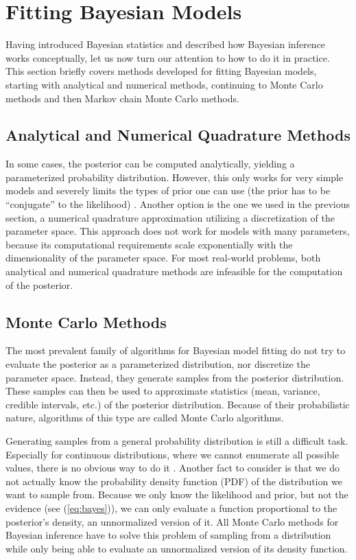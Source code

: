 \documentclass[12pt, a4paper]{report}
\begin{document}
\FloatBarrier
\section{Fitting Bayesian Models}
Having introduced Bayesian statistics and described how Bayesian inference works conceptually, let us now turn our attention to how to do it in practice.
This section briefly covers methods developed for fitting Bayesian models, starting with analytical and numerical methods, continuing to Monte Carlo methods and then Markov chain Monte Carlo methods.

\subsection{Analytical and Numerical Quadrature Methods}
In some cases, the posterior can be computed analytically, yielding a parameterized probability distribution.
However, this only works for very simple models and severely limits the types of prior one can use (the prior has to be ``conjugate'' to the likelihood) \cite[39]{mcelreath}.
Another option is the one we used in the previous section, a numerical quadrature approximation utilizing a discretization of the parameter space.
This approach does not work for models with many parameters, because its computational requirements scale exponentially with the dimensionality of the parameter space.
For most real-world problems, both analytical and numerical quadrature methods are infeasible for the computation of the posterior.

\subsection{Monte Carlo Methods}
The most prevalent family of algorithms for Bayesian model fitting do not try to evaluate the posterior as a parameterized distribution, nor discretize the parameter space.
Instead, they generate samples from the posterior distribution.
These samples can then be used to approximate statistics (mean, variance, credible intervals, etc.) of the posterior distribution.
Because of their probabilistic nature, algorithms of this type are called Monte Carlo algorithms.

Generating samples from a general probability distribution is still a difficult task.
Especially for continuous distributions, where we cannot enumerate all possible values, there is no obvious way to do it \cite[358]{mckay}.
Another fact to consider is that we do not actually know the probability density function (PDF) of the distribution we want to sample from.
Because we only know the likelihood and prior, but not the evidence (see (\ref{eq:bayes})), we can only evaluate a function proportional to the posterior's density, an unnormalized version of it.
All Monte Carlo methods for Bayesian inference have to solve this problem of sampling from a distribution while only being able to evaluate an unnormalized version of its density function.
\end{document}
